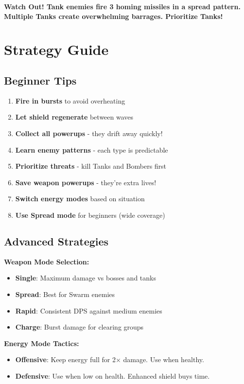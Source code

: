 \documentclass[11pt,a4paper]{article}
\newcommand{\infobox}[2]{%
    \vspace{0.3cm}
    \noindent\colorbox{#1!10}{%
        \parbox{\dimexpr\textwidth-2\fboxsep}{%
            \textcolor{#1}{\textbf{#2}}
        }
    }
    \vspace{0.3cm}
}
\begin{document}
\infobox{warningcolor}{\textbf{Watch Out!} Tank enemies fire 3 homing missiles in a spread pattern. Multiple Tanks create overwhelming barrages. Prioritize Tanks!}

\section{Strategy Guide}

\subsection{Beginner Tips}

\begin{enumerate}
    \item \textbf{Fire in bursts} to avoid overheating
    \item \textbf{Let shield regenerate} between waves
    \item \textbf{Collect all powerups} - they drift away quickly!
    \item \textbf{Learn enemy patterns} - each type is predictable
    \item \textbf{Prioritize threats} - kill Tanks and Bombers first
    \item \textbf{Save weapon powerups} - they're extra lives!
    \item \textbf{Switch energy modes} based on situation
    \item \textbf{Use Spread mode} for beginners (wide coverage)
\end{enumerate}

\subsection{Advanced Strategies}

\textbf{Weapon Mode Selection:}
\begin{itemize}
    \item \textbf{Single}: Maximum damage vs bosses and tanks
    \item \textbf{Spread}: Best for Swarm enemies
    \item \textbf{Rapid}: Consistent DPS against medium enemies
    \item \textbf{Charge}: Burst damage for clearing groups
\end{itemize}

\textbf{Energy Mode Tactics:}
\begin{itemize}
    \item \textbf{Offensive}: Keep energy full for 2× damage. Use when healthy.
    \item \textbf{Defensive}: Use when low on health. Enhanced shield buys time.
\end{itemize}
\end{document}
